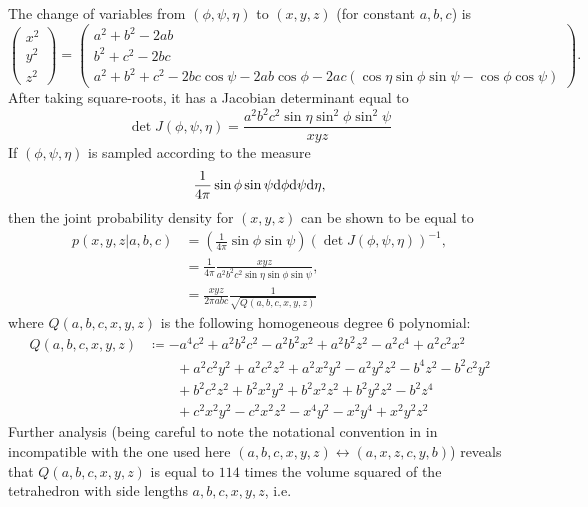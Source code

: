\documentclass[notitlepage, 10pt]{article}
\begin{document}
The change of variables from $(\phi,\psi,\eta)$ to $(x,y,z)$ (for constant $a,b,c$) is
\begin{equation}
    \begin{pmatrix}
        x^2 \\ y^2 \\ z^2
    \end{pmatrix}
    =
    \begin{pmatrix}
        a^2 + b^2 - 2ab \\ 
        b^2 + c^2 - 2bc \\ 
        a^2 + b^2 + c^2 - 2bc \cos \psi - 2 ab \cos \phi - 2 ac(\cos \eta \sin \phi \sin \psi -\cos \phi \cos\psi)
    \end{pmatrix}.
\end{equation}
After taking square-roots, it has a Jacobian determinant equal to
\begin{equation}
    \det J(\phi, \psi, \eta) = \frac{a^2b^2c^2 \sin \eta \sin^2 \phi \sin^2 \psi}{xyz}
\end{equation}
If $(\phi, \psi, \eta)$ is sampled according to the measure 
\begin{equation}
    \frac{1}{4 \pi}\sin \phi \sin \psi \mathrm{d} \phi \mathrm{d} \psi \mathrm{d} \eta,
\end{equation}
then the joint probability density for $(x,y,z)$ can be shown to be equal to
\begin{align}
    p(x,y,z|a,b,c) 
    &= \left(\frac{1}{4\pi}\sin \phi \sin \psi\right) \left(\det J(\phi, \psi, \eta)\right)^{-1}, \\
    &= \frac{1}{4\pi} \frac{xyz}{a^2b^2c^2 \sin \eta \sin \phi \sin \psi}, \\
    &= \frac{xyz}{2 \pi abc}\frac{1}{\sqrt{Q(a,b,c,x,y,z)}}
\end{align}
where $Q(a,b,c,x,y,z)$ is the following homogeneous degree $6$ polynomial:
\begin{align}
    Q(a,b,c,x,y,z) 
    &\coloneqq
    -a^4 c^2+a^2 b^2 c^2-a^2 b^2 x^2+a^2 b^2 z^2-a^2c^4+a^2 c^2 x^2\\&\qquad+a^2 c^2 y^2+a^2 c^2 z^2+a^2 x^2 y^2-a^2 y^2 z^2-b^4 z^2-b^2 c^2 y^2\\&\qquad+b^2 c^2 z^2+b^2 x^2 y^2 +b^2 x^2 z^2+b^2 y^2 z^2-b^2 z^4\\&\qquad+c^2 x^2 y^2-c^2 x^2 z^2-x^4 y^2-x^2 y^4+x^2 y^2 z^2
\end{align}
Further analysis \cite{richardson1902trigonometry} (being careful to note the notational convention in \cite{richardson1902trigonometry} in incompatible with the one used here $(a,b,c,x,y,z)\leftrightarrow (a,x,z,c,y,b)$) reveals that $Q(a,b,c,x,y,z)$ is equal to $114$ times the volume squared of the tetrahedron with side lengths $a,b,c,x,y,z$, i.e.
\end{document}
